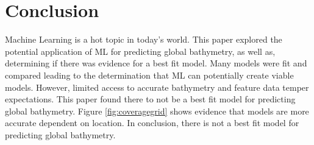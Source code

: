\section{Conclusion}
\setlength{\parindent}{10ex}
Machine Learning is a hot topic in today's world.
This paper explored the potential application of \ac{ML} for predicting global bathymetry, as well as, determining if there was evidence for a best fit model.
Many models were fit and compared leading to the determination that \ac{ML} can potentially create viable models.
However, limited access to accurate bathymetry and feature data temper expectations.
This paper found there to not be a best fit model for predicting global bathymetry. 
Figure \ref{fig:coveragegrid} shows evidence that models are more accurate dependent on location.
In conclusion, there is not a best fit model for predicting global bathymetry.